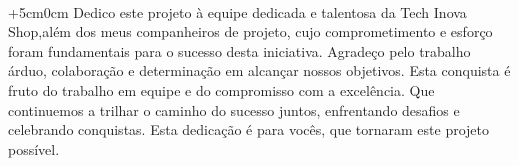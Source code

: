 
\begin{dedicatoria}\vspace*{\fill}
	\begin{flushright}\textbf{\\}
		\begin{changemargin}{+5cm}{0cm}
			Dedico este projeto à equipe dedicada e talentosa da Tech Inova Shop,além dos meus companheiros de projeto, cujo comprometimento e esforço foram fundamentais para o sucesso desta iniciativa. Agradeço pelo trabalho árduo, colaboração e determinação em alcançar nossos objetivos. Esta conquista é fruto do trabalho em equipe e do compromisso com a excelência. Que continuemos a trilhar o caminho do sucesso juntos, enfrentando desafios e celebrando conquistas. Esta dedicação é para vocês, que tornaram este projeto possível.
		\end{changemargin}
	\end{flushright}
\end{dedicatoria}
